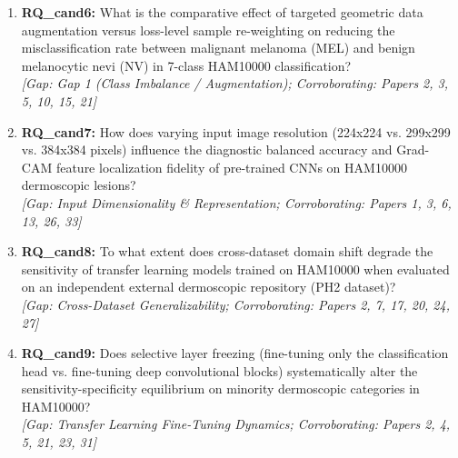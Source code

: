 \documentclass[11pt,a4paper]{article}
\begin{document}
\begin{enumerate}
\item \textbf{RQ\_cand6:} What is the comparative effect of targeted geometric data augmentation versus loss-level sample re-weighting on reducing the misclassification rate between malignant melanoma (MEL) and benign melanocytic nevi (NV) in 7-class HAM10000 classification? \\
\textit{[Gap: Gap 1 (Class Imbalance / Augmentation); Corroborating: Papers 2, 3, 5, 10, 15, 21]}
\item \textbf{RQ\_cand7:} How does varying input image resolution (224x224 vs. 299x299 vs. 384x384 pixels) influence the diagnostic balanced accuracy and Grad-CAM feature localization fidelity of pre-trained CNNs on HAM10000 dermoscopic lesions? \\
\textit{[Gap: Input Dimensionality \& Representation; Corroborating: Papers 1, 3, 6, 13, 26, 33]}
\item \textbf{RQ\_cand8:} To what extent does cross-dataset domain shift degrade the sensitivity of transfer learning models trained on HAM10000 when evaluated on an independent external dermoscopic repository (PH2 dataset)? \\
\textit{[Gap: Cross-Dataset Generalizability; Corroborating: Papers 2, 7, 17, 20, 24, 27]}
\item \textbf{RQ\_cand9:} Does selective layer freezing (fine-tuning only the classification head vs. fine-tuning deep convolutional blocks) systematically alter the sensitivity-specificity equilibrium on minority dermoscopic categories in HAM10000? \\
\textit{[Gap: Transfer Learning Fine-Tuning Dynamics; Corroborating: Papers 2, 4, 5, 21, 23, 31]}

\end{enumerate}
\end{document}

